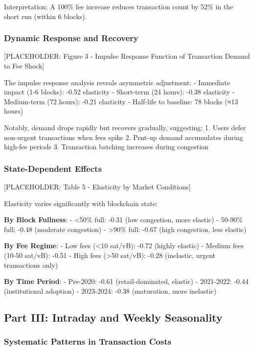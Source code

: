 \documentclass[
  12pt,
  letterpaper,
  DIV=11,
  numbers=noendperiod]{scrartcl}
\begin{document}
Interpretation: A 100\% fee increase reduces transaction count by 52\%
in the short run (within 6 blocks).

\subsubsection{Dynamic Response and
Recovery}\label{dynamic-response-and-recovery}

{[}PLACEHOLDER: Figure 3 - Impulse Response Function of Transaction
Demand to Fee Shock{]}

The impulse response analysis reveals asymmetric adjustment: - Immediate
impact (1-6 blocks): -0.52 elasticity - Short-term (24 hours): -0.38
elasticity - Medium-term (72 hours): -0.21 elasticity - Half-life to
baseline: 78 blocks (≈13 hours)

Notably, demand drops rapidly but recovers gradually, suggesting: 1.
Users defer non-urgent transactions when fees spike 2. Pent-up demand
accumulates during high-fee periods 3. Transaction batching increases
during congestion

\subsubsection{State-Dependent Effects}\label{state-dependent-effects}

{[}PLACEHOLDER: Table 5 - Elasticity by Market Conditions{]}

Elasticity varies significantly with blockchain state:

\textbf{By Block Fullness}: - \textless50\% full: -0.31 (low congestion,
more elastic) - 50-90\% full: -0.48 (moderate congestion) -
\textgreater90\% full: -0.67 (high congestion, less elastic)

\textbf{By Fee Regime}: - Low fees (\textless10 sat/vB): -0.72 (highly
elastic) - Medium fees (10-50 sat/vB): -0.51 - High fees (\textgreater50
sat/vB): -0.28 (inelastic, urgent transactions only)

\textbf{By Time Period}: - Pre-2020: -0.61 (retail-dominated, elastic) -
2021-2022: -0.44 (institutional adoption) - 2023-2024: -0.38
(maturation, more inelastic)

\subsection{Part III: Intraday and Weekly
Seasonality}\label{part-iii-intraday-and-weekly-seasonality}

\subsubsection{Systematic Patterns in Transaction
Costs}\label{systematic-patterns-in-transaction-costs}
\end{document}
